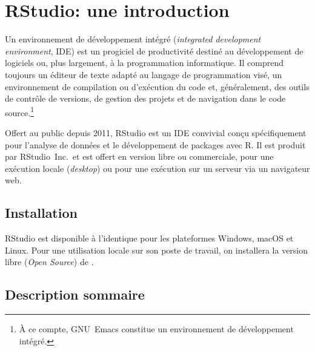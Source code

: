 
\chapter{RStudio: une introduction}
\label{chap:rstudio}

Un environnement de développement intégré (\emph{integrated
  development environment}, IDE) est un progiciel de productivité
destiné au développement de logiciels ou, plus largement, à la
programmation informatique. Il comprend toujours un éditeur de texte
adapté au langage de programmation visé, un environnement de
compilation ou d'exécution du code et, généralement, des outils de
contrôle de versions, de gestion des projets et de navigation dans le
code source.\footnote{%
  À ce compte, GNU~Emacs constitue un environnement de développement
  intégré.} %

Offert au public depuis 2011, RStudio est un IDE convivial conçu
spécifiquement pour l'analyse de données et le développement de
packages avec R. Il est produit par RStudio~Inc.\ et est offert en
version libre ou commerciale, pour une exécution locale
(\emph{desktop}) ou pour une exécution sur un serveur via un
navigateur web.


\section{Installation}
\label{sec:rstudio:installation}

RStudio est disponible à l'identique pour les plateformes Windows,
macOS et Linux. Pour une utilisation locale sur son poste de travail,
on installera la version libre (\emph{Open Source}) de
.


\section{Description sommaire}
\label{sec:rstudio:description}

